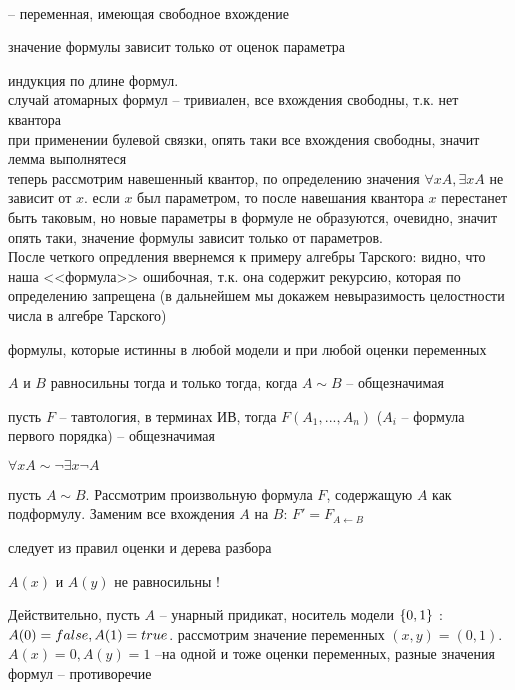 \begin{definition} \\
 -- переменная, имеющая свободное вхождение
\end{definition} 
\begin{lemma}
 значение формулы зависит только от  оценок параметра
\end{lemma}
\beginproof
индукция по длине формул. \\
 случай атомарных формул -- тривиален, все вхождения свободны, т.к. нет квантора \\
при применении булевой связки, опять таки все вхождения свободны, значит лемма выполнятеся \\
теперь рассмотрим  навешенный квантор, по определению значения $\forall xA , \exists xA$ не зависит от $x$. если $x$ был параметром, то после навешания квантора $x$ перестанет быть таковым, но новые параметры в формуле не образуются, очевидно, значит опять таки, значение формулы зависит только от параметров. \\
После четкого опредления ввернемся к примеру алгебры Тарского: видно, что наша <<формула>> ошибочная, т.к. она содержит рекурсию, которая по определению запрещена (в дальнейшем мы докажем невыразимость целостности числа в алгебре Тарского)

\begin{definition} 
формулы, которые истинны в любой модели и при любой оценки переменных
\end{definition}

\begin{definition} 
$A$ и $B$ равносильны тогда и только тогда, когда $A \sim B$ -- общезначимая
\end{definition}

\begin{example}
пусть $F$ -- тавтология, в терминах ИВ, тогда $F(A_1, ... , A_n)$  ($A_i$ -- формула первого порядка) -- общезначимая
\end{example}

\begin{example}
$\forall xA \sim \neg \exists x \neg A$
\end{example}

\begin{lemma} \label{lemma replacement} 
 пусть $A \sim B$. Рассмотрим произвольную формула $F$, содержащую $A$ как подформулу. Заменим все вхождения $A$ на $B$: $F' = F_{A \leftarrow B}$
\end{lemma}
\beginproof следует из правил оценки и дерева разбора

\begin{remark}
$A(x)$ и $A(y)$ не равносильны !
\end{remark}
Действительно, пусть $A$ -- унарный придикат, носитель модели $\left\{ 0, 1 \right\}$ : $A(0) = false, A(1) \hm{=} true$. рассмотрим  значение переменных $ (x, y) = (0, 1)$. $A(x) = 0, A(y) = 1$ --на одной и тоже оценки переменных, разные значения формул -- противоречие 
